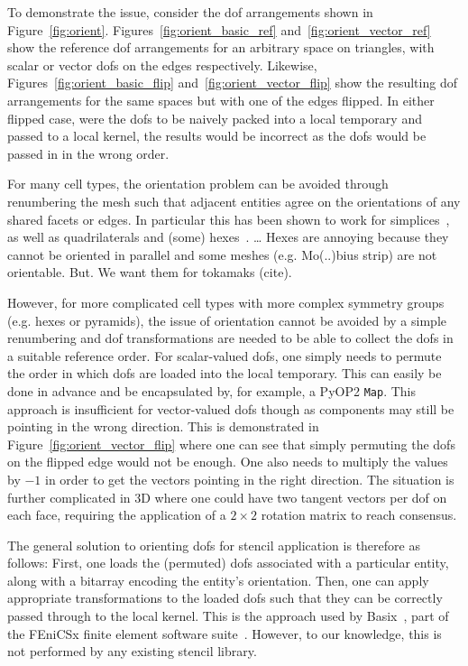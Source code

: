 To demonstrate the issue, consider the \gls{dof} arrangements shown in Figure~\ref{fig:orient}.
Figures~\ref{fig:orient_basic_ref} and~\ref{fig:orient_vector_ref} show the reference \gls{dof} arrangements for an arbitrary space on triangles, with scalar or vector \glspl{dof} on the edges respectively.
Likewise, Figures~\ref{fig:orient_basic_flip} and~\ref{fig:orient_vector_flip} show the resulting \gls{dof} arrangements for the same spaces but with one of the edges flipped.
In either flipped case, were the \glspl{dof} to be naively packed into a local temporary and passed to a local kernel, the results would be incorrect as the \glspl{dof} would be passed in in the wrong order.

For many cell types, the orientation problem can be avoided through renumbering the mesh such that adjacent entities agree on the orientations of any shared facets or edges.
In particular this has been shown to work for simplices~\cite{rognesEfficientAssemblyMathrmdiv2010}, as well as quadrilaterals and (some) hexes~\cite{agelekOrientingEdgesUnstructured2017,homolyaParallelEdgeOrientation2016}.
\dots
Hexes are annoying because they cannot be oriented in parallel and some meshes (e.g. Mo(..)bius strip) are not orientable.
But. We want them for tokamaks (cite).

However, for more complicated cell types with more complex symmetry groups (e.g. hexes or pyramids), the issue of orientation cannot be avoided by a simple renumbering and \gls{dof} transformations are needed to be able to collect the \glspl{dof} in a suitable reference order.
For scalar-valued \glspl{dof}, one simply needs to permute the order in which \glspl{dof} are loaded into the local temporary.
This can easily be done in advance and be encapsulated by, for example, a PyOP2 \texttt{Map}.
This approach is insufficient for vector-valued \glspl{dof} though as components may still be pointing in the wrong direction.
This is demonstrated in Figure~\ref{fig:orient_vector_flip} where one can see that simply permuting the \glspl{dof} on the flipped edge would not be enough.
One also needs to multiply the values by $-1$ in order to get the vectors pointing in the right direction.
The situation is further complicated in 3D where one could have two tangent vectors per \gls{dof} on each face, requiring the application of a $2\times2$ rotation matrix to reach consensus.

The general solution to orienting \glspl{dof} for stencil application is therefore as follows:
First, one loads the (permuted) \glspl{dof} associated with a particular entity, along with a bitarray encoding the entity's orientation.
Then, one can apply appropriate transformations to the loaded \glspl{dof} such that they can be correctly passed through to the local kernel.
This is the approach used by Basix~\cite{scroggsConstructionArbitraryOrder2021,scroggsBasixRuntimeFinite2022}, part of the FEniCSx finite element software suite~\cite{}.
However, to our knowledge, this is not performed by any existing stencil library.

